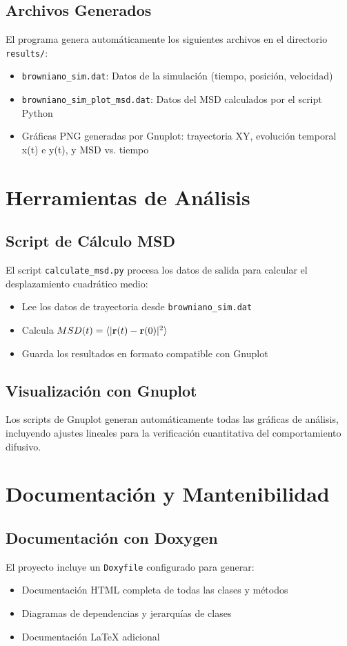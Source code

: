 \documentclass[11pt,a4paper]{article}
\begin{document}
\subsection{Archivos Generados}
El programa genera automáticamente los siguientes archivos en el directorio \texttt{results/}:

\begin{itemize}
    \item \texttt{browniano\_sim.dat}: Datos de la simulación (tiempo, posición, velocidad)
    \item \texttt{browniano\_sim\_plot\_msd.dat}: Datos del MSD calculados por el script Python
    \item Gráficas PNG generadas por Gnuplot: trayectoria XY, evolución temporal x(t) e y(t), y MSD vs. tiempo
\end{itemize}

\section{Herramientas de Análisis}

\subsection{Script de Cálculo MSD}
El script \texttt{calculate\_msd.py} procesa los datos de salida para calcular el desplazamiento cuadrático medio:
\begin{itemize}
    \item Lee los datos de trayectoria desde \texttt{browniano\_sim.dat}
    \item Calcula $MSD(t) = \langle |\vb{r}(t) - \vb{r}(0)|^2 \rangle$
    \item Guarda los resultados en formato compatible con Gnuplot
\end{itemize}

\subsection{Visualización con Gnuplot}
Los scripts de Gnuplot generan automáticamente todas las gráficas de análisis, incluyendo ajustes lineales para la verificación cuantitativa del comportamiento difusivo.

\section{Documentación y Mantenibilidad}

\subsection{Documentación con Doxygen}
El proyecto incluye un \texttt{Doxyfile} configurado para generar:
\begin{itemize}
    \item Documentación HTML completa de todas las clases y métodos
    \item Diagramas de dependencias y jerarquías de clases
    \item Documentación LaTeX adicional
\end{itemize}
\end{document}

